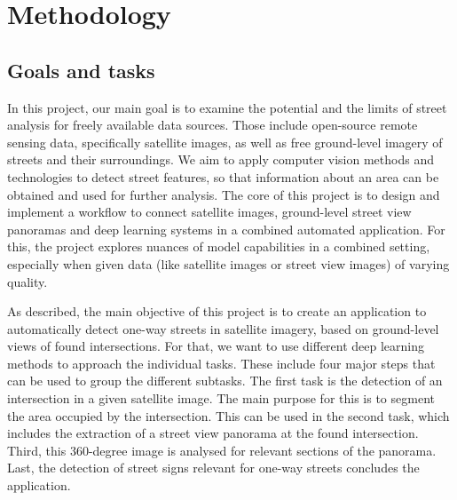 \section{Methodology}

\subsection{Goals and tasks}
In this project, our main goal is to examine the potential and the limits of street analysis for freely available data sources. Those include open-source remote sensing data, specifically satellite images, as well as free ground-level imagery of streets and their surroundings. We aim to apply computer vision methods and technologies to detect street features, so that information about an area can be obtained and used for further analysis. The core of this project is to design and implement a workflow to connect satellite images, ground-level street view panoramas and deep learning systems in a combined automated application. For this, the project explores nuances of model capabilities in a combined setting, especially when given data (like satellite images or street view images) of varying quality.

As described, the main objective of this project is to create an application to automatically detect one-way streets in satellite imagery, based on ground-level views of found intersections. For that, we want to use different deep learning methods to approach the individual tasks. These include four major steps that can be used to group the different subtasks. The first task is the detection of an intersection in a given satellite image. The main purpose for this is to segment the area occupied by the intersection. This can be used in the second task, which includes the extraction of a street view panorama at the found intersection. Third, this 360-degree image is analysed for relevant sections of the panorama. Last, the detection of street signs relevant for one-way streets concludes the application.

